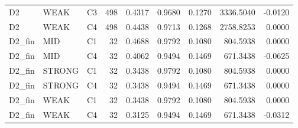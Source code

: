 \begin{tabular}{lllrrrrrr}
D2 & WEAK & C3 & 498 & 0.4317 & 0.9680 & 0.1270 & 3336.5040 & -0.0120 \\
D2 & WEAK & C4 & 498 & 0.4438 & 0.9713 & 0.1268 & 2758.8253 & 0.0000 \\
D2\_fin & MID & C1 & 32 & 0.4688 & 0.9792 & 0.1080 & 804.5938 & 0.0000 \\
D2\_fin & MID & C4 & 32 & 0.4062 & 0.9494 & 0.1469 & 671.3438 & -0.0625 \\
D2\_fin & STRONG & C1 & 32 & 0.3438 & 0.9792 & 0.1080 & 804.5938 & 0.0000 \\
D2\_fin & STRONG & C4 & 32 & 0.3438 & 0.9494 & 0.1469 & 671.3438 & 0.0000 \\
D2\_fin & WEAK & C1 & 32 & 0.3438 & 0.9792 & 0.1080 & 804.5938 & 0.0000 \\
D2\_fin & WEAK & C4 & 32 & 0.3125 & 0.9494 & 0.1469 & 671.3438 & -0.0312 \\
\bottomrule
\end{tabular}
